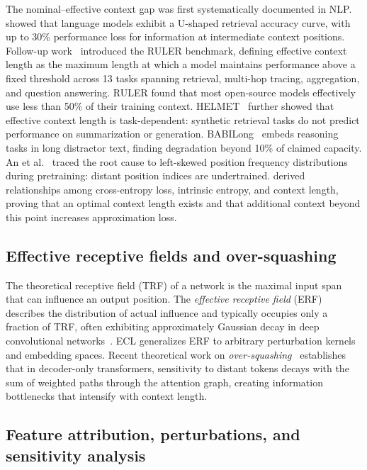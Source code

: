 The nominal--effective context gap was first systematically documented in NLP. \citet{Liu2024LostInMiddle} showed that language models exhibit a U-shaped retrieval accuracy curve, with up to 30\% performance loss for information at intermediate context positions. Follow-up work~\citep{Hsieh2024RULER} introduced the RULER benchmark, defining effective context length as the maximum length at which a model maintains performance above a fixed threshold across 13 tasks spanning retrieval, multi-hop tracing, aggregation, and question answering. RULER found that most open-source models effectively use less than 50\% of their training context. HELMET~\citep{Yen2024HELMET} further showed that effective context length is task-dependent: synthetic retrieval tasks do not predict performance on summarization or generation. BABILong~\citep{Kuratov2024BABILong} embeds reasoning tasks in long distractor text, finding degradation beyond 10\% of claimed capacity. An et al.~\citep{An2024EffCtx} traced the root cause to left-skewed position frequency distributions during pretraining: distant position indices are undertrained. \citet{Shi2025Entropy} derived relationships among cross-entropy loss, intrinsic entropy, and context length, proving that an optimal context length exists and that additional context beyond this point increases approximation loss.

\subsection{Effective receptive fields and over-squashing}

The theoretical receptive field (TRF) of a network is the maximal input span that can influence an output position. The \emph{effective receptive field} (ERF) describes the distribution of actual influence and typically occupies only a fraction of TRF, often exhibiting approximately Gaussian decay in deep convolutional networks~\citep{Luo2016EffectiveRF}. ECL generalizes ERF to arbitrary perturbation kernels and embedding spaces. Recent theoretical work on \emph{over-squashing}~\citep{Barbero2024OverSquashing} establishes that in decoder-only transformers, sensitivity to distant tokens decays with the sum of weighted paths through the attention graph, creating information bottlenecks that intensify with context length.

\subsection{Feature attribution, perturbations, and sensitivity analysis}

